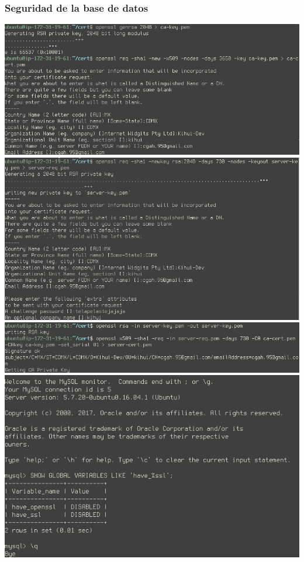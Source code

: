 \documentclass[9pt]{article}
\begin{document}
\subsubsection*{Seguridad de la base de datos}
\includegraphics[width=\textwidth]{mysql_cert}
\includegraphics[width=\textwidth]{mysql_server-key}
\includegraphics[width=\textwidth]{mysql_server-cert}
\includegraphics[width=\textwidth]{mysql_ssl-disabled}
\end{document}
